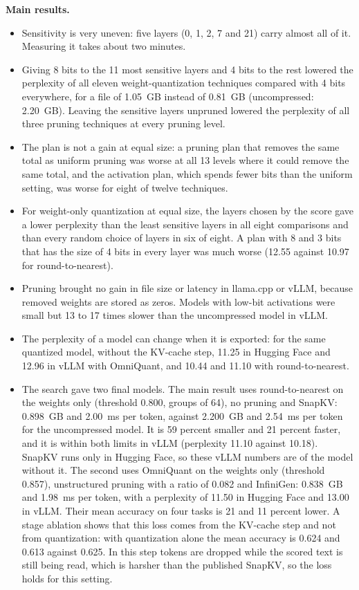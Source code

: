 \documentclass[
11pt, %
english, %
singlespacing, %
headsepline, %
]{MastersDoctoralThesis} %
\begin{document}
\medskip\noindent\textbf{Main results.}
\begin{itemize}
  \item Sensitivity is very uneven: five layers (0, 1, 2, 7 and 21) carry almost all of it. Measuring it takes about two minutes.
  \item Giving 8 bits to the 11 most sensitive layers and 4 bits to the rest lowered the perplexity of all eleven weight-quantization techniques compared with 4 bits everywhere, for a file of 1.05~GB instead of 0.81~GB (uncompressed: 2.20~GB). Leaving the sensitive layers unpruned lowered the perplexity of all three pruning techniques at every pruning level.
  \item The plan is not a gain at equal size: a pruning plan that removes the same total as uniform pruning was worse at all 13 levels where it could remove the same total, and the activation plan, which spends fewer bits than the uniform setting, was worse for eight of twelve techniques.
  \item For weight-only quantization at equal size, the layers chosen by the score gave a lower perplexity than the least sensitive layers in all eight comparisons and than every random choice of layers in six of eight. A plan with 8 and 3 bits that has the size of 4 bits in every layer was much worse (12.55 against 10.97 for round-to-nearest).
  \item Pruning brought no gain in file size or latency in llama.cpp or vLLM, because removed weights are stored as zeros. Models with low-bit activations were small but 13 to 17 times slower than the uncompressed model in vLLM.
  \item The perplexity of a model can change when it is exported: for the same quantized model, without the KV-cache step, 11.25 in Hugging Face and 12.96 in vLLM with OmniQuant, and 10.44 and 11.10 with round-to-nearest.
  \item The search gave two final models. The main result uses round-to-nearest on the weights only (threshold 0.800, groups of 64), no pruning and SnapKV: 0.898~GB and 2.00~ms per token, against 2.200~GB and 2.54~ms per token for the uncompressed model. It is 59 percent smaller and 21 percent faster, and it is within both limits in vLLM (perplexity 11.10 against 10.18). SnapKV runs only in Hugging Face, so these vLLM numbers are of the model without it. The second uses OmniQuant on the weights only (threshold 0.857), unstructured pruning with a ratio of 0.082 and InfiniGen: 0.838~GB and 1.98~ms per token, with a perplexity of 11.50 in Hugging Face and 13.00 in vLLM. Their mean accuracy on four tasks is 21 and 11 percent lower. A stage ablation shows that this loss comes from the KV-cache step and not from quantization: with quantization alone the mean accuracy is 0.624 and 0.613 against 0.625. In this step tokens are dropped while the scored text is still being read, which is harsher than the published SnapKV, so the loss holds for this setting.

\end{itemize}
\end{document}
